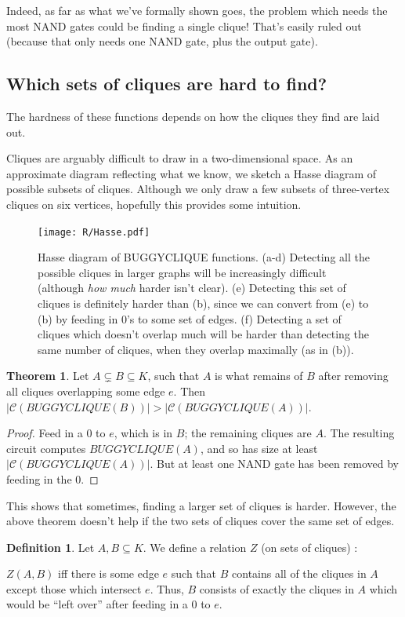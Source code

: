 \documentclass[12pt]{article}
\theoremstyle{definition}
\newtheorem{thm}{Theorem}[section]
\newtheorem{defn}{Definition}[section]
\newcommand{\bigC}[0]{\mathcal{C}}
\begin{document}
Indeed, as far as what we've formally shown goes, the problem which needs
the most NAND gates could be finding a single clique! That's easily ruled out
(because that only needs one NAND gate, plus the output gate).

\subsection{Which sets of cliques are hard to find?}
\label{sec:whichCliques}

The hardness of these functions depends
on how the cliques they find are laid out.

Cliques are arguably difficult to draw in a two-dimensional space.
As an approximate diagram reflecting what we know,
we sketch a Hasse diagram of possible subsets of cliques. Although
we only draw a few subsets of three-vertex cliques
on six vertices, hopefully this provides some
intuition.

\begin{figure}
\centering
\texttt{[image: R/Hasse.pdf]}
\caption{Hasse diagram of BUGGYCLIQUE functions.
(a-d) 
Detecting all the possible cliques in larger graphs will be
increasingly difficult (although {\em how much} harder isn't clear).
(e) 
Detecting this set of cliques is definitely harder than (b),
since we can convert from (e) to (b) by feeding in 0's to
some set of edges.
(f) Detecting a set of cliques which doesn't overlap much will be
harder than detecting the same number of cliques, when they overlap
maximally (as in (b)).}
\label{fig:Hasse}
\end{figure}

\begin{thm}
\label{edgeZonking}
Let $A \subsetneq B \subseteq K$, such that $A$ is what remains
of $B$ after removing all cliques overlapping some edge $e$.
Then $|\bigC(BUGGYCLIQUE(B))| > |\bigC(BUGGYCLIQUE(A))|$.
\end{thm}
\begin{proof}
Feed in a 0 to $e$, which is in $B$; the remaining cliques are $A$.
The resulting
circuit computes $BUGGYCLIQUE(A)$, and so has size
at least $|\bigC(BUGGYCLIQUE(A))|$. But at least one
NAND gate has been removed by feeding in the 0.
\end{proof}

This shows that sometimes, finding a larger set of cliques is
harder. However, the above theorem doesn't help if the two
sets of cliques cover the same set of edges.

\begin{defn}
\label{zRelation}
Let $A, B \subseteq K$. We define a relation $Z$ (on sets of cliques) :

$Z(A,B)$ iff there is some edge $e$ such that $B$ contains all of the
cliques in $A$ except those which intersect $e$. Thus, $B$ consists
of exactly the cliques in $A$ which would be ``left over'' after
feeding in a 0 to $e$.
\end{defn}
\end{document}
